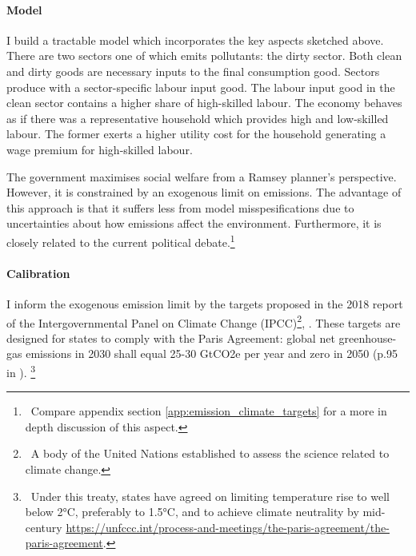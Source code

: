 \paragraph{Model}
I build a tractable model which incorporates the key aspects sketched above. There are two sectors one of which emits pollutants: the dirty sector. Both clean and dirty goods are necessary inputs to the final consumption good. Sectors produce with a sector-specific labour input good. The labour input good in the clean sector contains a higher share of high-skilled labour. 
The economy behaves as if there was a representative household which provides high and low-skilled labour. The former exerts a higher utility cost for the household generating a wage premium for high-skilled labour. 

The government maximises social welfare from a Ramsey planner's perspective. However, it is constrained by an exogenous limit on emissions. The advantage of this approach is that it suffers less from  model misspesifications due to  uncertainties about how emissions affect the environment. Furthermore, it is closely related to the current political debate.\footnote{\ Compare appendix section \ref{app:emission_climate_targets} for a more in depth discussion of this aspect. } 

\paragraph{Calibration}
I inform the exogenous emission limit by the  targets proposed in the 2018 report of the Intergovernmental Panel on Climate Change (IPCC)\footnote{\ A body of the United Nations established to assess the science related to climate change.},  \cite{Rogelj2018MitigationDevelopment.}. These targets are designed for states to comply with the Paris Agreement: global net greenhouse-gas emissions in 2030 shall equal 25-30 GtCO2e per year and zero in 2050 (p.95 in \cite{Rogelj2018MitigationDevelopment.}).%
\footnote{\ Under this treaty, states have agreed on limiting temperature rise to well below 2°C, preferably to 1.5°C, and to achieve climate neutrality by mid-century \url{https://unfccc.int/process-and-meetings/the-paris-agreement/the-paris-agreement}. }

